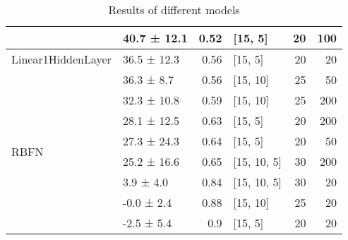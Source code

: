 \begin{table*}[h]
\begin{tabular}{llrlrr}
         & 40.7 ± 12.1 &  0.52 & [15, 5]        &         20 &      100 \\
 \hline
Linear1HiddenLayer         & 36.5 ± 12.3 &  0.56 & [15, 5]        &         20 &       20 \\
 \hline
\multirow{8}{*}{RBFN}         & 36.3 ± 8.7  &  0.56 & [15, 10]       &         25 &       50 \\
         & 32.3 ± 10.8 &  0.59 & [15, 10]       &         25 &      200 \\
         & 28.1 ± 12.5 &  0.63 & [15, 5]        &         20 &      200 \\
         & 27.3 ± 24.3 &  0.64 & [15, 5]        &         20 &       50 \\
         & 25.2 ± 16.6 &  0.65 & [15, 10, 5]    &         30 &      200 \\
         & 3.9 ± 4.0   &  0.84 & [15, 10, 5]    &         30 &       20 \\
         & -0.0 ± 2.4  &  0.88 & [15, 10]       &         25 &       20 \\
         & -2.5 ± 5.4  &  0.9  & [15, 5]        &         20 &       20 \\
\hline
\end{tabular}
        \caption{Results of different models}
        \label{models}
    \end{table*}
    
